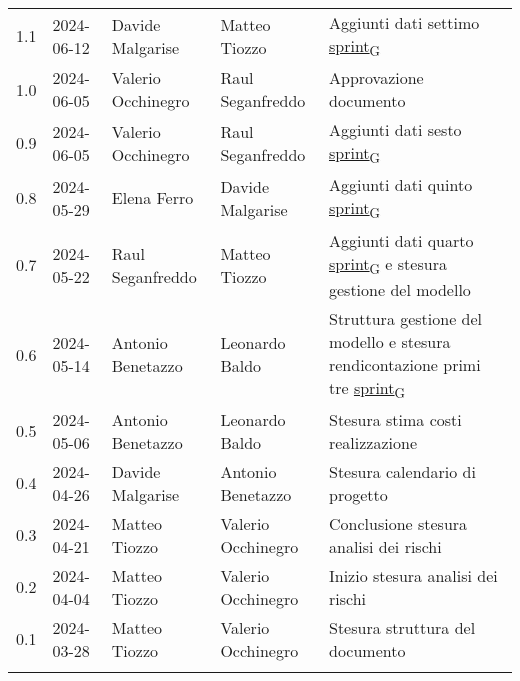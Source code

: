 \documentclass[12pt]{article} %
\begin{document}
\begin{table}[!h]
\begin{center}
\begin{tabular}{ l l l l p{6cm} }
			1.1 & 2024-06-12 & Davide Malgarise   & Matteo Tiozzo      & Aggiunti dati settimo \href{https://7last.github.io/docs/pb/documentazione-interna/glossario\#sprint}{sprint\textsubscript{G}}\\
			1.0 & 2024-06-05 & Valerio Occhinegro & Raul Seganfreddo   & Approvazione documento\\
			0.9 & 2024-06-05 & Valerio Occhinegro & Raul Seganfreddo   & Aggiunti dati sesto \href{https://7last.github.io/docs/pb/documentazione-interna/glossario\#sprint}{sprint\textsubscript{G}}\\
			0.8 & 2024-05-29 & Elena Ferro        & Davide Malgarise   & Aggiunti dati quinto \href{https://7last.github.io/docs/pb/documentazione-interna/glossario\#sprint}{sprint\textsubscript{G}}\\
			0.7 & 2024-05-22 & Raul Seganfreddo   & Matteo Tiozzo      & Aggiunti dati quarto \href{https://7last.github.io/docs/pb/documentazione-interna/glossario\#sprint}{sprint\textsubscript{G}} e stesura gestione del modello \\
			0.6 & 2024-05-14 & Antonio Benetazzo  & Leonardo Baldo     & Struttura gestione del modello e stesura rendicontazione primi tre \href{https://7last.github.io/docs/pb/documentazione-interna/glossario\#sprint}{sprint\textsubscript{G}}  \\
			0.5 & 2024-05-06 & Antonio Benetazzo  & Leonardo Baldo     & Stesura stima costi realizzazione \\
			0.4 & 2024-04-26 & Davide Malgarise   & Antonio Benetazzo  & Stesura calendario di progetto \\
			0.3 & 2024-04-21 & Matteo Tiozzo      & Valerio Occhinegro & Conclusione stesura analisi dei rischi \\
			0.2 & 2024-04-04 & Matteo Tiozzo      & Valerio Occhinegro & Inizio stesura analisi dei rischi \\
			0.1 & 2024-03-28 & Matteo Tiozzo      & Valerio Occhinegro & Stesura struttura del documento \\
			\\[-1.5ex] \hline
		\end{tabular}
	\end{center}
\end{table}

\newpage

\tableofcontents

\newpage

\listoftables

\listoffigures

\newpage



\newpage



\newpage



\newpage



\newpage



\newpage


\end{document}
